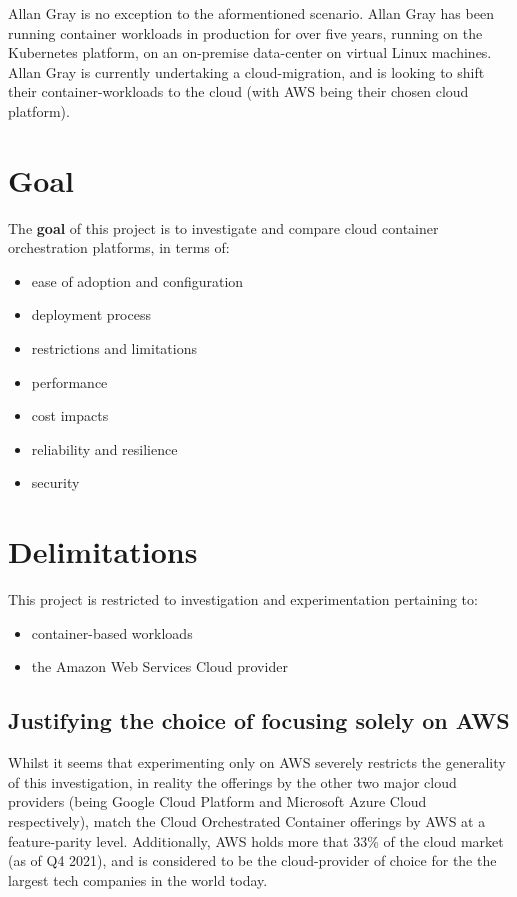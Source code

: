 \noindent Allan Gray is no exception to the aformentioned scenario. Allan Gray has been running container workloads in production for over five years,
running on the Kubernetes platform, on an on-premise data-center on virtual Linux machines.
Allan Gray is currently undertaking a cloud-migration, and is looking to shift their container-workloads to the cloud (with AWS being their chosen cloud platform).

\chapter{Goal}
\noindent The \textbf{goal} of this project is to investigate and compare cloud container orchestration platforms, in terms of:
\begin{itemize}
  \item ease of adoption and configuration
  \item deployment process
  \item restrictions and limitations
  \item performance
  \item cost impacts
  \item reliability and resilience
  \item security
\end{itemize}

\chapter{Delimitations}
This project is restricted to investigation and experimentation pertaining to:
\begin{itemize}
  \item container-based workloads
  \item the Amazon Web Services Cloud provider
\end{itemize}

\section{Justifying the choice of focusing solely on AWS}
Whilst it seems that experimenting only on AWS severely restricts the generality of this investigation, in reality the offerings by the other two major cloud providers
(being Google Cloud Platform and Microsoft Azure Cloud respectively), match the Cloud Orchestrated Container offerings by AWS at a feature-parity level\cite{contaier_workloads}.
Additionally, AWS holds more that 33\% of the cloud market (as of Q4 2021)\cite{aws_cloud_share},
and is considered to be the cloud-provider of choice for the the largest tech companies in the world today\cite{aws_users}.

